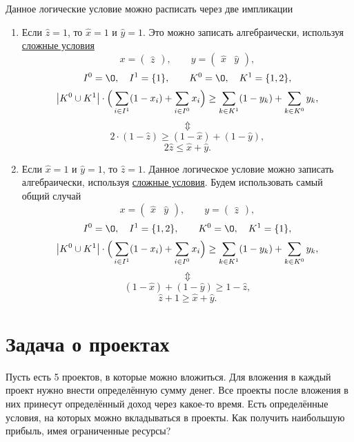 Данное логические условие можно расписать через две импликации
\begin{enumerate}[nosep]
	\item Если $\hat{z} = 1$, то $\hat{x} = 1$ и $\hat{y} = 1$. Это можно записать алгебраически, используя \hyperref[fact:complex_conditions]{сложные условия}
	\[
	x = \begin{pmatrix}\hat{z}\end{pmatrix}, \qquad y = \begin{pmatrix} \hat{x} & \hat{y} \end{pmatrix},
	\]
	\[
	I^0 = \O, \quad I^1 = \{1\}, \qquad K^0 = \O, \quad K^1 = \{1, 2\},
	\]
	\[
	\abs{K^0 \cup K^1} \cdot \Big(\sum_{i \in I^1}(1-x_i) + \sum_{i \in I^0}x_i\Big) \ge \sum_{k \in K^1}(1-y_k) + \sum_{k \in K^0}y_k,
	\]	
	\[\Updownarrow\]	
	\[
	2 \cdot (1 - \hat{z}) \ge (1 - \hat{x}) + (1 - \hat{y}),
	\]
	\[
	2\hat{z} \le \hat{x} + \hat{y}.
	\]
	
	\item Если $\hat{x} = 1$ и $\hat{y} = 1$, то $\hat{z} = 1$. Данное логическое условие можно записать алгебраически, используя \hyperref[fact:complex_conditions]{сложные условия}. Будем использовать самый общий случай
	\[
	x = \begin{pmatrix}\hat{x} & \hat{y}\end{pmatrix}, \qquad y = \begin{pmatrix} \hat{z} \end{pmatrix},
	\]
	\[
	I^0 = \O, \quad I^1 = \{1, 2\}, \qquad K^0 = \O, \quad K^1 = \{1\},
	\]
	\[
	\abs{K^0 \cup K^1} \cdot \Big(\sum_{i \in I^1}(1-x_i) + \sum_{i \in I^0}x_i\Big) \ge \sum_{k \in K^1}(1-y_k) + \sum_{k \in K^0}y_k,
	\]
	\[\Updownarrow\]
	\[
	(1 - \hat{x}) + (1 - \hat{y}) \ge 1 - \hat{z},
	\]
	\[
	\hat{z} + 1 \ge \hat{x} + \hat{y}.
	\]
\end{enumerate}

\section{Задача о проектах}

\problem[о проектах]

Пусть есть 5 проектов, в которые можно вложиться. Для вложения в каждый проект нужно внести определённую сумму денег. Все проекты после вложения в них принесут определённый доход через какое-то время. Есть определённые условия, на которых можно вкладываться в проекты. Как получить наибольшую прибыль, имея ограниченные ресурсы?

